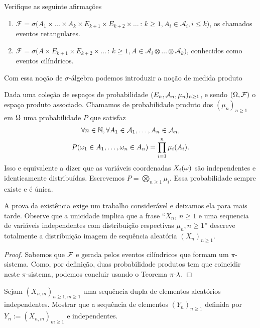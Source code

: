 \begin{exercise}
  Verifique as seguinte afirmações
  \begin{enumerate}[\quad a)]
  \item $\mathcal{F} = \sigma\big(A_1 \times \dots \times A_k \times E_{k+1} \times E_{k+2} \times \dots\, : \, k \geq 1, A_i \in \mathcal{A}_i, i \leq k\big)$,
  os chamados eventos retangulares.
  \item $\mathcal{F} = \sigma\big(A \times E_{k+1} \times E_{k+2} \times \dots\, : \, k \geq 1, A \in \mathcal{A}_i \otimes \dots \otimes \mathcal{A}_k\big)$,
  conhecidos como eventos cilíndricos.
  \end{enumerate}
\end{exercise}



Com essa noção de $\sigma$-álgebra podemos introduzir a noção de medida produto
\begin{definition}
Dada uma coleção de espaços de probabilidade $(E_n,{\mathcal A}_n,\mu_n)_{n\ge 1}$, e
sendo $(\Omega,{\mathcal F})$ o espaço produto associado. Chamamos de probabilidade produto dos $(\mu_n)_{n\ge 1}$ em $\Omega$ uma probabilidade $P$ que satisfaz
\begin{multline}
\forall n\in {\ensuremath{\mathbb N}}, \forall A_1\in {\ensuremath{\mathcal A}}_1,\dots, A_n\in {\ensuremath{\mathcal A}}_n, \\ P(\omega_1\in A_1,\dots ,\omega_n\in A_n)=\prod_{i=1}^n \mu_i(A_i).
\end{multline}
Isso e equivalente a dizer que as variáveis coordenadas $X_i(\omega)$ são independentes e identicamente distribuídas.
Escrevemos $P=\bigotimes_{n\ge 1} \mu_i$.
Essa probabilidade sempre existe e é única.
\end{definition}

A prova da existência exige um trabalho considerável e deixamos ela para mais tarde.
Observe que a unicidade implica que a frase ``$X_n, \ n\ge 1$ e uma sequencia de variáveis independentes com distribuição respectivas $\mu_n, n\ge 1$''
descreve totalmente a distribuição imagem de sequência aleatória $(X_n)_{n\ge 1}$.

\begin{proof}
 Sabemos que ${\mathcal F}$ e gerada pelos eventos cilíndricos que formam um $\pi$-sistema.
 Como, por definição, duas probabilidade produtos tem que coincidir neste $\pi$-sistema, podemos concluir usando
 o Teorema $\pi$-$\lambda$.
\end{proof}

\begin{exercise}\label{ex:duplo}
Sejam $(X_{n,m})_{n\ge 1,m\ge 1}$ uma sequência dupla de elementos aleatórios independentes.
Mostrar que a sequência de elementos $(Y_n)_{n\ge 1}$ definida por $Y_n:=(X_{n,m})_{m\ge 1}$ e independentes.
\end{exercise}



